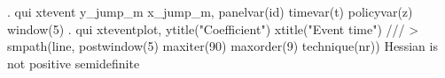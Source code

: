 . qui xtevent y_jump_m x_jump_m, panelvar(id) timevar(t) policyvar(z) window(5) 
{\smallskip}
. qui xteventplot, ytitle("Coefficient") xtitle("Event time") ///
> smpath(line, postwindow(5) maxiter(90) maxorder(9) technique(nr)) 
Hessian is not positive semidefinite
{\smallskip}
